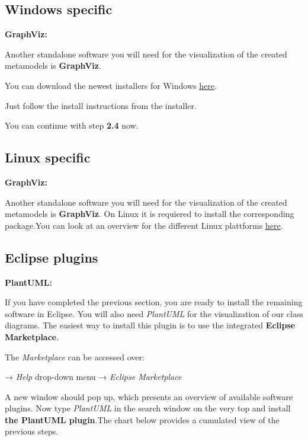 \subsection{Windows specific}

\textbf{GraphViz:}

Another standalone software you will need for the visualization of the created metamodels is \textbf{GraphViz}.

You can download the newest installers for Windows \href{https://graphviz.org/download/}{\underline{here}}.

Just follow the install instructions from the installer.\newline

You can continue with step \textbf{2.4} now.
\subsection{Linux specific}

\textbf{GraphViz:}

Another standalone software you will need for the visualization of the created metamodels is \textbf{GraphViz}. On Linux it is requiered to install the corresponding package.\newline You can look at an overview for the different Linux plattforms \href{https://graphviz.org/download/}{\underline{here}}.

\clearpage

\subsection{Eclipse plugins}

\textbf{PlantUML:}

If you have completed the previous section, you are ready to install the remaining software in Eclipse. You will also need \textsf{\textit{PlantUML}} for the visualization of our class diagrams. The easiest way to install this plugin is to use the integrated \textbf{Eclipse Marketplace}.

The \textsf{\textit{Marketplace}} can be accessed over:\newline

\centering
→ \textsf{\textit{Help}} drop-down menu →
\textsf{\textit{Eclipse Marketplace}}\newline

\raggedright
A new window should pop up, which presents an overview of available software plugins. Now type \textit{\textsf{PlantUML}} in the search window on the very top and install \textbf{the PlantUML plugin}.The chart below provides a cumulated view of the previous steps.\newline\newline

